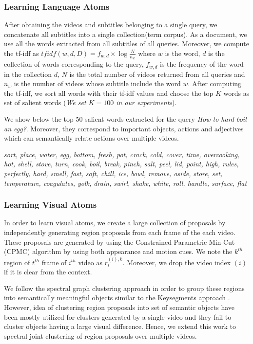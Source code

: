 \subsubsection{Learning Language Atoms}
After obtaining the videos and subtitles belonging to a single query, we concatenate all subtitles into a single collection(term corpus). As a document, we use all the words extracted from all subtitles of all queries. Moreover, we compute the tf-idf as $tfidf(w,d,D)=f_{w,d} \times \log \frac{N}{n_{w}}$ where $w$ is the word, $d$ is the collection of words corresponding to the query, $f_{w,d}$ is the frequency of the word in the collection $d$, $N$ is the total number of videos returned from all queries and $n_{w}$ is the number of videos whose subtitle include the word $w$. After computing the tf-idf, we sort all words with their tf-idf values and choose the top $K$ words as set of salient words (\emph{We set $K=100$ in our experiments}).

We show below the top 50 salient words extracted for the query \emph{How to hard boil an egg?}. Moreover, they correspond to important objects, actions and adjectives which can semantically relate actions over multiple videos.

\footnotesize
\emph{sort, place, water, egg, bottom, fresh, pot, crack, cold, cover, time, overcooking, hot, shell, stove, turn, cook, boil, break, pinch, salt, peel, lid, point, high, rules, perfectly, hard, smell, fast, soft, chill, ice, bowl, remove, aside, store, set, temperature, coagulates, yolk, drain, swirl, shake, white, roll, handle, surface, flat}
\normalsize


\subsubsection{Learning Visual Atoms}
In order to learn visual atoms, we create a large collection of proposals by independently generating region proposals from each frame of the each video. These proposals are generated by using the Constrained Parametric Min-Cut (CPMC) \cite{cpmc} algorithm by using both appearance and motion cues. We note the $k^{th}$ region of $t^{th}$ frame of $i^{th}$ video as $r^{(i),k}_t$. Moreover, we drop the video index $(i)$ if it is clear from the context.

We follow the spectral graph clustering approach in order to group these regions into semantically meaningful objects similar to the Keysegments approach \cite{keysegments}. However, idea of clustering region proposals into set of semantic objects have been mostly utilized for clusters generated by a single video and they fail to cluster objects having a large visual difference. Hence, we extend this work to spectral joint clustering of region proposals over multiple videos.

